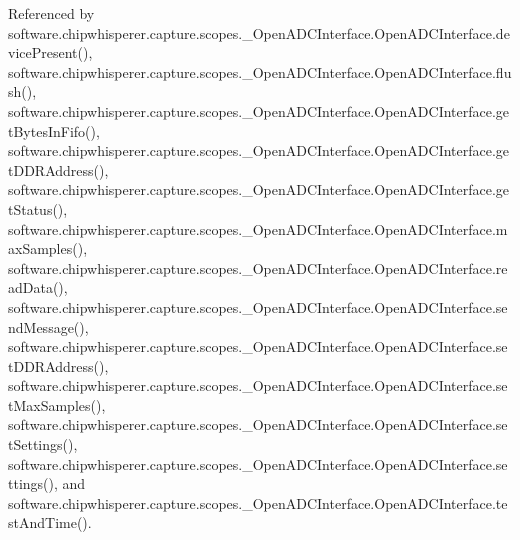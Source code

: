 Referenced by software.\+chipwhisperer.\+capture.\+scopes.\+\_\+\+Open\+A\+D\+C\+Interface.\+Open\+A\+D\+C\+Interface.\+device\+Present(), software.\+chipwhisperer.\+capture.\+scopes.\+\_\+\+Open\+A\+D\+C\+Interface.\+Open\+A\+D\+C\+Interface.\+flush(), software.\+chipwhisperer.\+capture.\+scopes.\+\_\+\+Open\+A\+D\+C\+Interface.\+Open\+A\+D\+C\+Interface.\+get\+Bytes\+In\+Fifo(), software.\+chipwhisperer.\+capture.\+scopes.\+\_\+\+Open\+A\+D\+C\+Interface.\+Open\+A\+D\+C\+Interface.\+get\+D\+D\+R\+Address(), software.\+chipwhisperer.\+capture.\+scopes.\+\_\+\+Open\+A\+D\+C\+Interface.\+Open\+A\+D\+C\+Interface.\+get\+Status(), software.\+chipwhisperer.\+capture.\+scopes.\+\_\+\+Open\+A\+D\+C\+Interface.\+Open\+A\+D\+C\+Interface.\+max\+Samples(), software.\+chipwhisperer.\+capture.\+scopes.\+\_\+\+Open\+A\+D\+C\+Interface.\+Open\+A\+D\+C\+Interface.\+read\+Data(), software.\+chipwhisperer.\+capture.\+scopes.\+\_\+\+Open\+A\+D\+C\+Interface.\+Open\+A\+D\+C\+Interface.\+send\+Message(), software.\+chipwhisperer.\+capture.\+scopes.\+\_\+\+Open\+A\+D\+C\+Interface.\+Open\+A\+D\+C\+Interface.\+set\+D\+D\+R\+Address(), software.\+chipwhisperer.\+capture.\+scopes.\+\_\+\+Open\+A\+D\+C\+Interface.\+Open\+A\+D\+C\+Interface.\+set\+Max\+Samples(), software.\+chipwhisperer.\+capture.\+scopes.\+\_\+\+Open\+A\+D\+C\+Interface.\+Open\+A\+D\+C\+Interface.\+set\+Settings(), software.\+chipwhisperer.\+capture.\+scopes.\+\_\+\+Open\+A\+D\+C\+Interface.\+Open\+A\+D\+C\+Interface.\+settings(), and software.\+chipwhisperer.\+capture.\+scopes.\+\_\+\+Open\+A\+D\+C\+Interface.\+Open\+A\+D\+C\+Interface.\+test\+And\+Time().


